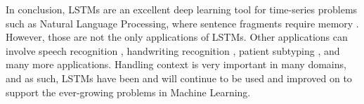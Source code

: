 In conclusion, LSTMs are an excellent deep learning tool for time-series problems such as Natural Language Processing, where sentence fragments require memory \citep{Graves:2006:CTC:1143844.1143891,Gers:2001:LRN:2325782.2326800,Schmidhuber:2005:EHN:1642293.1642430,Schafer:2006:LLT:2125268.2125278}. However, those are not the only applications of LSTMs. Other applications can involve speech recognition \citep{Saon2017}, handwriting recognition \citep{Graves2009}, patient subtyping \citep{Baytas2017}, and many more applications. Handling context is very important in many domains, and as such, LSTMs have been and will continue to be used and improved on to support the ever-growing problems in Machine Learning.

